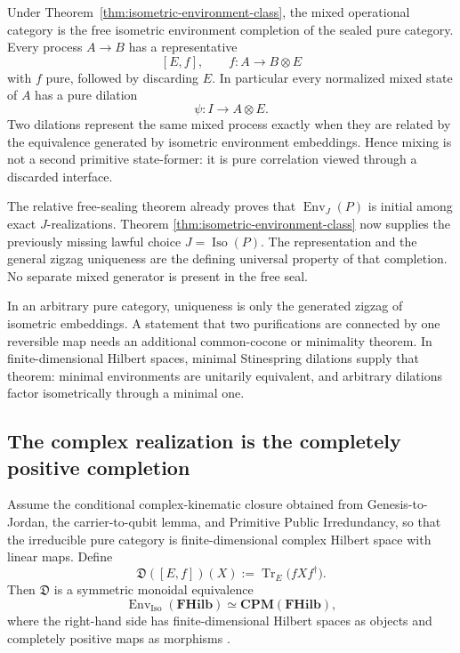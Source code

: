 \begin{theorem}
\label{thm:free-environment-completion-closed}
Under Theorem~\ref{thm:isometric-environment-class}, the mixed operational category
is the free isometric environment completion of the sealed pure category.  Every
process \(A\to B\) has a representative
\[
 [E,f],
 \qquad
 f:A\longrightarrow B\otimes E
\]
with \(f\) pure, followed by discarding \(E\).  In particular every normalized
mixed state of \(A\) has a pure dilation
\[
 \psi:I\longrightarrow A\otimes E.
\]
Two dilations represent the same mixed process exactly when they are related by the
equivalence generated by isometric environment embeddings.  Hence mixing is not a
second primitive state-former: it is pure correlation viewed through a discarded
interface.
\end{theorem}

\begin{proofsketch}
The relative free-sealing theorem already proves that
\(\operatorname{Env}_J(P)\) is initial among exact \(J\)-realizations.  Theorem
\ref{thm:isometric-environment-class} now supplies the previously missing lawful
choice \(J=\operatorname{Iso}(P)\).  The representation and the general zigzag
uniqueness are the defining universal property of that completion.  No separate
mixed generator is present in the free seal.
\end{proofsketch}

\begin{remark}
In an arbitrary pure category, uniqueness is only the generated zigzag of
isometric embeddings.  A statement that two purifications are connected by one
reversible map needs an additional common-cocone or minimality theorem.  In
finite-dimensional Hilbert spaces, minimal Stinespring dilations supply that
theorem: minimal environments are unitarily equivalent, and arbitrary dilations
factor isometrically through a minimal one.
\end{remark}

\subsection{The complex realization is the completely positive completion}

\begin{theorem}
\label{thm:env-cpm-equivalence}
Assume the conditional complex-kinematic closure obtained from
Genesis-to-Jordan, the carrier-to-qubit lemma, and Primitive Public Irredundancy,
so that the irreducible pure category is finite-dimensional complex Hilbert space
with linear maps.  Define
\[
 \mathfrak D([E,f])(X)
 :=
 \operatorname{Tr}_E\!\bigl(fXf^\dagger\bigr).
\]
Then \(\mathfrak D\) is a symmetric monoidal equivalence
\[
 \boxed{
 \operatorname{Env}_{\operatorname{Iso}}(\mathbf{FHilb})
 \simeq
 \mathbf{CPM}(\mathbf{FHilb}),}
\]
where the right-hand side has finite-dimensional Hilbert spaces as objects and
completely positive maps as morphisms \cite{selinger-cpm,coecke-channels}.
\end{theorem}

